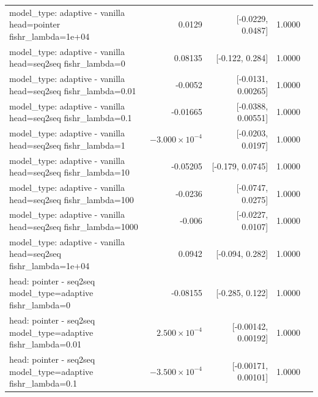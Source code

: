 \documentclass[10pt]{article}
\makeatletter
\newcommand{\stackcell}[1]{\begin{tabular}[t]{@{}l@{}}#1\end{tabular}}
\makeatother
\begin{document}
{\begin{longtable}{lrrrl}
\stackcell{model\_type: adaptive - vanilla\\\footnotesize head=pointer fishr\_lambda=1e+04 } & 0.0129 & [-0.0229, 0.0487] & 1.0000 & \\
\stackcell{model\_type: adaptive - vanilla\\\footnotesize head=seq2seq fishr\_lambda=0 } & 0.08135 & [-0.122, 0.284] & 1.0000 & \\
\stackcell{model\_type: adaptive - vanilla\\\footnotesize head=seq2seq fishr\_lambda=0.01 } & -0.0052 & [-0.0131, 0.00265] & 1.0000 & \\
\stackcell{model\_type: adaptive - vanilla\\\footnotesize head=seq2seq fishr\_lambda=0.1 } & -0.01665 & [-0.0388, 0.00551] & 1.0000 & \\
\stackcell{model\_type: adaptive - vanilla\\\footnotesize head=seq2seq fishr\_lambda=1 } & $-3.000\times10^{-4}$ & [-0.0203, 0.0197] & 1.0000 & \\
\stackcell{model\_type: adaptive - vanilla\\\footnotesize head=seq2seq fishr\_lambda=10 } & -0.05205 & [-0.179, 0.0745] & 1.0000 & \\
\stackcell{model\_type: adaptive - vanilla\\\footnotesize head=seq2seq fishr\_lambda=100 } & -0.0236 & [-0.0747, 0.0275] & 1.0000 & \\
\stackcell{model\_type: adaptive - vanilla\\\footnotesize head=seq2seq fishr\_lambda=1000 } & -0.006 & [-0.0227, 0.0107] & 1.0000 & \\
\stackcell{model\_type: adaptive - vanilla\\\footnotesize head=seq2seq fishr\_lambda=1e+04 } & 0.0942 & [-0.094, 0.282] & 1.0000 & \\
\stackcell{head: pointer - seq2seq\\\footnotesize model\_type=adaptive fishr\_lambda=0 } & -0.08155 & [-0.285, 0.122] & 1.0000 & \\
\stackcell{head: pointer - seq2seq\\\footnotesize model\_type=adaptive fishr\_lambda=0.01 } & $2.500\times10^{-4}$ & [-0.00142, 0.00192] & 1.0000 & \\
\stackcell{head: pointer - seq2seq\\\footnotesize model\_type=adaptive fishr\_lambda=0.1 } & $-3.500\times10^{-4}$ & [-0.00171, 0.00101] & 1.0000 & \\

\end{longtable}}
\end{document}
